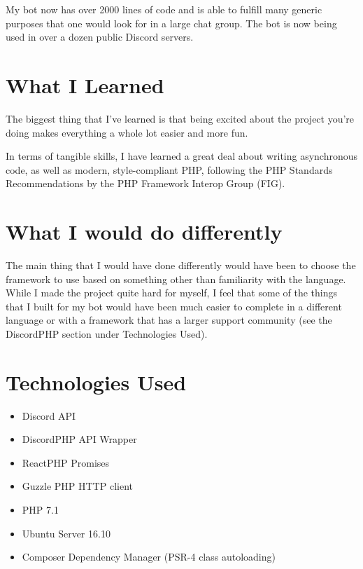 \documentclass[12pt]{article} %
\begin{document}
My bot now has over 2000 lines of code and is able to fulfill many generic purposes that one would look for in a large chat group. The bot is now being used in over a dozen public Discord servers.

\section*{What I Learned}

The biggest thing that I've learned is that being excited about the project you're doing makes everything a whole lot easier and more fun. 

In terms of tangible skills, I have learned a great deal about writing asynchronous code, as well as modern, style-compliant PHP, following the PHP Standards Recommendations by the PHP Framework Interop Group (FIG). 



\section*{What I would do differently}

The main thing that I would have done differently would have been to choose the framework to use based on something other than familiarity with the language. While I made the project quite hard for myself, I feel that some of the things that I built for my bot would have been much easier to complete in a different language or with a framework that has a larger support community (see the DiscordPHP section under Technologies Used).


\section*{Technologies Used}

\begin{itemize}
	\item Discord API
	\item DiscordPHP API Wrapper
	\item ReactPHP Promises
	\item Guzzle PHP HTTP client
	\item PHP 7.1
	\item Ubuntu Server 16.10
	\item Composer Dependency Manager (PSR-4 class autoloading)
\end{itemize}
\end{document}
